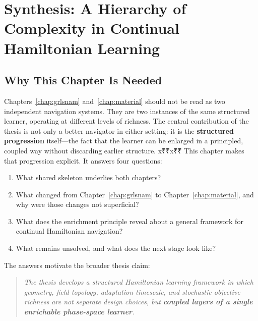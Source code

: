 
\chapter{Synthesis: A Hierarchy of Complexity in Continual Hamiltonian Learning}
\label{chap:hierarchy}

\providecommand{\Ham}{\mathcal{H}}
\providecommand{\Potential}{\mathcal{R}}
\providecommand{\PhaseState}{z}
\providecommand{\Pos}{q}
\providecommand{\Mom}{p}
\providecommand{\Mass}{\mathrm{M}}
\providecommand{\J}{\mathbb{J}}

\section{Why This Chapter Is Needed}
\label{sec:ch5:why}

Chapters~\ref{chap:grlsnam} and~\ref{chap:material} should not be read
as two independent navigation systems.
They are two instances of the same structured learner, operating at
different levels of richness.
The central contribution of the thesis is not only a better navigator
in either setting: it is the \textbf{structured progression} itself—the
fact that the learner can be enlarged in a principled, coupled way
without discarding earlier structure.
x₹₹x₹₹
This chapter makes that progression explicit.
It answers four questions:
\begin{enumerate}
  \item What shared skeleton underlies both chapters?
  \item What changed from Chapter~\ref{chap:grlsnam} to
        Chapter~\ref{chap:material}, and why were those changes not
        superficial?
  \item What does the enrichment principle reveal about a general
        framework for continual Hamiltonian navigation?
  \item What remains unsolved, and what does the next stage look like?
\end{enumerate}

The answers motivate the broader thesis claim:

\begin{quote}\itshape
The thesis develops a structured Hamiltonian learning framework in
which geometry, field topology, adaptation timescale, and stochastic objective
richness are not separate design choices, but \textbf{coupled layers of
a single enrichable phase-space learner}.
\end{quote}

